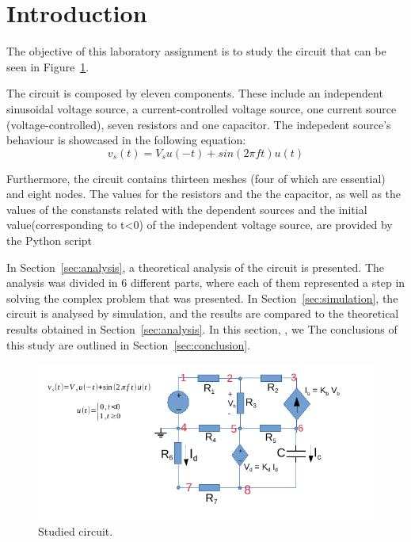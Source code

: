 \section{Introduction}
\label{sec:introduction}

The objective of this laboratory assignment is to study the circuit that can be seen in Figure~\ref{fig:T2Circuit}.
 
The circuit is composed by eleven components. These include an independent sinusoidal voltage source, a current-controlled voltage source, one current source (voltage-controlled), seven resistors and one capacitor.
The indepedent source's behaviour is showcased in the following equation:
\begin {equation}
   v_s(t)= V_s u(-t) + sin(2\pi f t)u(t)
   \end {equation}
   
 Furthermore, the circuit contains thirteen meshes (four of which are essential) and eight nodes.
The values for the resistors and the the capacitor, as well as the values of the constansts related with the dependent sources and the initial value(corresponding to t<0) of the independent voltage source, are provided by the Python script

In Section~\ref{sec:analysis}, a theoretical analysis of the circuit is
presented. The analysis was divided in 6 different parts, where each of them represented a step in solving the complex problem that was presented. In Section~\ref{sec:simulation}, the circuit is analysed by
simulation, and the results are compared to the theoretical results obtained in Section~\ref{sec:analysis}. In this section, , we  The conclusions of this study are outlined in
Section~\ref{sec:conclusion}.

\vspace{4.0cm}

\begin{figure}[h] \centering
\includegraphics[width=0.8\linewidth]{T2Circuit.pdf}
\caption{Studied circuit.}
\label{fig:T2Circuit}
\end{figure}
